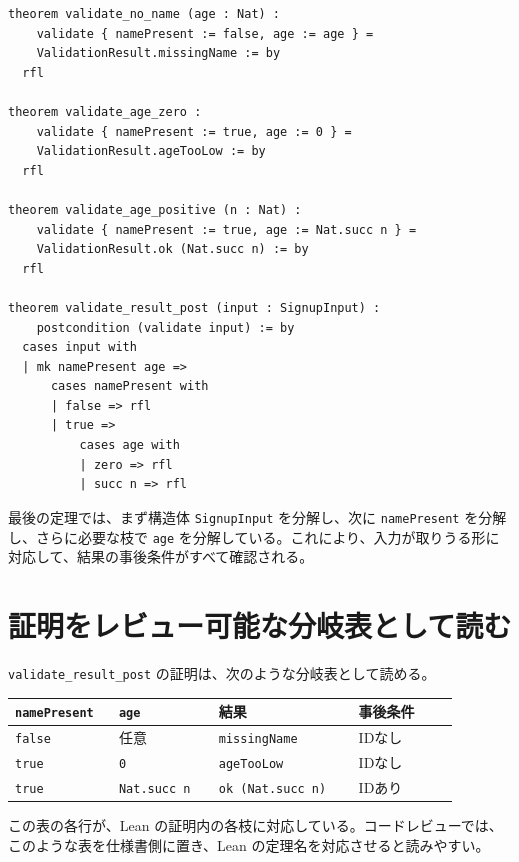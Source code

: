 \begin{listing}[htbp]
\begin{verbatim}
theorem validate_no_name (age : Nat) :
    validate { namePresent := false, age := age } =
    ValidationResult.missingName := by
  rfl

theorem validate_age_zero :
    validate { namePresent := true, age := 0 } =
    ValidationResult.ageTooLow := by
  rfl

theorem validate_age_positive (n : Nat) :
    validate { namePresent := true, age := Nat.succ n } =
    ValidationResult.ok (Nat.succ n) := by
  rfl

theorem validate_result_post (input : SignupInput) :
    postcondition (validate input) := by
  cases input with
  | mk namePresent age =>
      cases namePresent with
      | false => rfl
      | true =>
          cases age with
          | zero => rfl
          | succ n => rfl
\end{verbatim}
\caption{入力パターンを分解して結果の事後条件を証明する}
\label{lst:ch13-validate-result-post}
\end{listing}

最後の定理では、まず構造体 \texttt{SignupInput} を分解し、次に \texttt{namePresent} を分解し、さらに必要な枝で \texttt{age} を分解している。これにより、入力が取りうる形に対応して、結果の事後条件がすべて確認される。

\section{証明をレビュー可能な分岐表として読む}

\texttt{validate\_result\_post} の証明は、次のような分岐表として読める。

\begin{center}
\begin{tabular}{p{0.20\linewidth}p{0.20\linewidth}p{0.28\linewidth}p{0.20\linewidth}}
\toprule
\texttt{namePresent} & \texttt{age} & 結果 & 事後条件 \\
\midrule
\texttt{false} & 任意 & \texttt{missingName} & IDなし \\
\texttt{true} & \texttt{0} & \texttt{ageTooLow} & IDなし \\
\texttt{true} & \texttt{Nat.succ n} & \texttt{ok (Nat.succ n)} & IDあり \\
\bottomrule
\end{tabular}
\end{center}

この表の各行が、Lean の証明内の各枝に対応している。コードレビューでは、このような表を仕様書側に置き、Lean の定理名を対応させると読みやすい。

